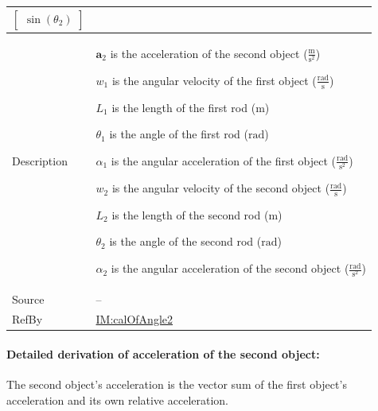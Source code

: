 \documentclass[12pt]{article}
\begin{document}
{\begin{minipage}{\textwidth}
\begin{tabular}{>{\raggedright}p{}>{\raggedright\arraybackslash}p{}}
\begin{displaymath}
{\begin{bmatrix}
                                                                                                                                                                     \sin\left({θ_{2}}\right)
                                                                                                                                                                     \end{bmatrix}}
           \end{displaymath}
\\ \midrule
Description & \begin{symbDescription}
              \item{${\symbf{a}_{2}}$ is the acceleration of the second object ($\frac{\text{m}}{\text{s}^{2}}$)}
              \item{${w_{1}}$ is the angular velocity of the first object ($\frac{\text{rad}}{\text{s}}$)}
              \item{${L_{1}}$ is the length of the first rod (${\text{m}}$)}
              \item{${θ_{1}}$ is the angle of the first rod (${\text{rad}}$)}
              \item{${α_{1}}$ is the angular acceleration of the first object ($\frac{\text{rad}}{\text{s}^{2}}$)}
              \item{${w_{2}}$ is the angular velocity of the second object ($\frac{\text{rad}}{\text{s}}$)}
              \item{${L_{2}}$ is the length of the second rod (${\text{m}}$)}
              \item{${θ_{2}}$ is the angle of the second rod (${\text{rad}}$)}
              \item{${α_{2}}$ is the angular acceleration of the second object ($\frac{\text{rad}}{\text{s}^{2}}$)}
              \end{symbDescription}
\\ \midrule
Source & --
         
\\ \midrule
RefBy & \hyperref[IM:calOfAngle2]{IM:calOfAngle2}
        
\\ \bottomrule
\end{tabular}
\end{minipage}

\paragraph{Detailed derivation of acceleration of the second object:}
\label{GD:accelerationVector2Deriv}
The second object's acceleration is the vector sum of the first object's acceleration and its own relative acceleration.

}
\end{document}
